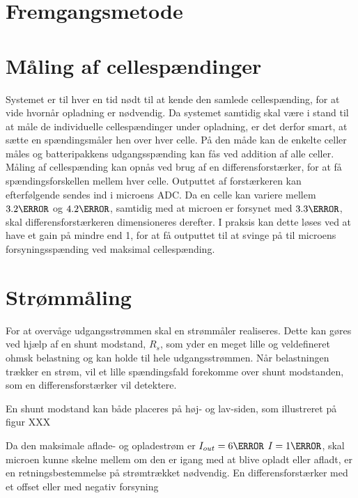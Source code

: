 \section{Fremgangsmetode}

\section{Måling af cellespændinger}
Systemet er til hver en tid nødt til at kende den samlede cellespænding, for at vide hvornår opladning er nødvendig. Da systemet samtidig skal være i stand til at måle de individuelle cellespændinger under opladning, er det derfor smart, at sætte en spændingsmåler hen over hver celle. På den måde kan de enkelte celler måles og batteripakkens udgangsspænding kan fås ved addition af alle celler.
\\

Måling af cellespænding kan opnås ved brug af en differensforstærker, for at få spændingsforskellen mellem hver celle. Outputtet af forstærkeren kan efterfølgende sendes ind i microens ADC. Da en celle kan variere mellem $3.2\volt$ og $4.2\volt$, samtidig med at microen er forsynet med $3.3\volt$, skal differensforstærkeren dimensioneres derefter. I praksis kan dette løses ved at have et gain på mindre end 1, for at få outputtet til at svinge på til microens forsyningsspænding ved maksimal cellespænding.
\\


\section{Strømmåling}
For at overvåge udgangsstrømmen skal en strømmåler realiseres. Dette kan gøres ved hjælp af en shunt modstand, $R_{s}$, som yder en meget lille og veldefineret ohmsk belastning og kan holde til hele udgangsstrømmen. Når belastningen trækker en strøm, vil et lille spændingsfald forekomme over shunt modstanden, som en differensforstærker vil detektere. 


En shunt modstand kan både placeres på høj- og lav-siden, som illustreret på figur XXX


Da den maksimale aflade- og opladestrøm  er $I_{out} = 6\ampere$  $I_{} = 1\ampere$, skal microen kunne skelne mellem om den er igang med at blive opladt eller afladt, er en retningsbestemmelse på strømtrækket nødvendig. En differensforstærker med et offset
eller med negativ forsyning


